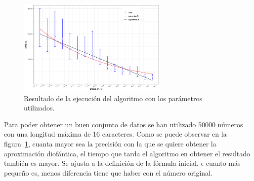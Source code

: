 \documentclass[11pt,letterpaper]{article}
\begin{document}
\begin{figure}[H]
	\centering
	\includegraphics[width=0.65\textwidth]{mediant-approximation.png}
	\caption{Resultado de la ejecución del algoritmo con los parámetros utilizados.}
	\label{fig:grafico}
\end{figure}

Para poder obtener un buen conjunto de datos se han utilizado 50000 números con una longitud máxima de 16 caracteres. Como se puede observar en la figura~\ref{fig:grafico}, cuanta mayor sea la precisión con la que se quiere obtener la aproximación diofántica, el tiempo que tarda el algoritmo en obtener el resultado también es mayor. Se ajusta a la definición de la fórmula inicial, $\epsilon$ cuanto más pequeño es, menos diferencia tiene que haber con el número original.
\end{document}
